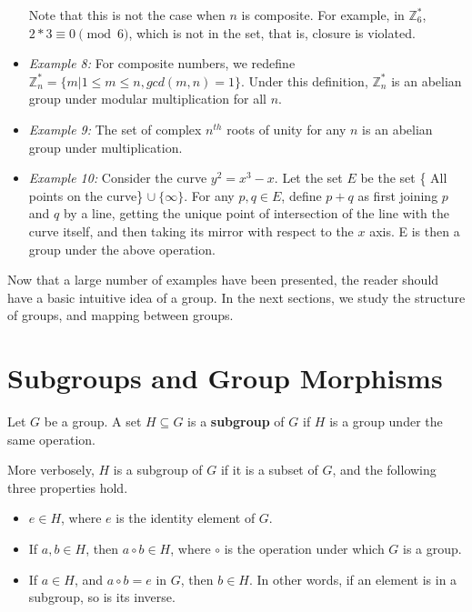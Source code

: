 \begin{itemize}
    Note that this is not the case when $n$ is composite. 
    For example, in $\mathbb{Z}_{6}^{*}$, $2 * 3 \equiv 0 \pmod{6}$, which is not in the set, that is, closure is violated.
  \item \emph{Example 8:} For composite numbers, we redefine $\mathbb{Z}_{n}^{*} = \{m | 1 \leq m \leq n, gcd(m, n)=1 \}$.
    Under this definition, $\mathbb{Z}_{n}^{*}$ is an abelian group under modular multiplication for all $n$.
  \item \emph{Example 9:} The set of complex $n^{th}$ roots of unity for any $n$ is an abelian group under multiplication.
  \item \emph{Example 10:} Consider the curve $y^2 = x^3 - x$.
    Let the set $E$ be the set \{ All points on the curve\} $\cup \  \{ \infty \}$.
    For any $p, q \in E$, define $p+q$ as first joining $p$ and $q$ by a line, getting the unique point of intersection of the line with the curve itself, and then taking its mirror with respect to the $x$ axis.
    E is then a group under the above operation.
\end{itemize}
 
Now that a large number of examples have been presented, the reader should have a basic intuitive idea of a group.
In the next sections, we study the structure of groups, and mapping between groups.

\section{Subgroups and Group Morphisms}
\begin{definition} \label{def:subgroup}
  Let $G$ be a group.
  A set $H \subseteq G$ is a \textbf{subgroup} of $G$ if $H$ is a group under the same operation. 
\end{definition}
More verbosely, $H$ is a subgroup of $G$ if it is a subset of $G$, and the following three properties hold.
\begin{itemize}
  \item $e \in H$, where $e$ is the identity element of $G$.
  \item If $a, b \in H$, then $a \circ b \in H$, where $\circ$ is the operation under which $G$ is a group.
  \item If $a \in H$, and $a \circ b = e$ in $G$, then $b \in H$.
    In other words, if an element is in a subgroup, so is its inverse.
\end{itemize}

